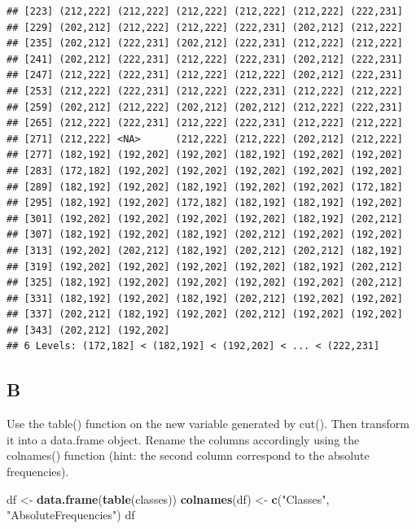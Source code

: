 \documentclass[
]{article}
\newenvironment{Shaded}{\begin{snugshade}}{\end{snugshade}}
\newcommand{\FunctionTok}[1]{\textcolor[rgb]{0.13,0.29,0.53}{\textbf{#1}}}
\newcommand{\NormalTok}[1]{#1}
\newcommand{\OtherTok}[1]{\textcolor[rgb]{0.56,0.35,0.01}{#1}}
\newcommand{\StringTok}[1]{\textcolor[rgb]{0.31,0.60,0.02}{#1}}
\begin{document}
\begin{verbatim}
## [223] (212,222] (212,222] (212,222] (212,222] (212,222] (222,231]
## [229] (202,212] (212,222] (212,222] (222,231] (202,212] (212,222]
## [235] (202,212] (222,231] (202,212] (222,231] (212,222] (212,222]
## [241] (202,212] (222,231] (212,222] (222,231] (202,212] (222,231]
## [247] (212,222] (222,231] (212,222] (212,222] (202,212] (222,231]
## [253] (212,222] (222,231] (212,222] (222,231] (212,222] (212,222]
## [259] (202,212] (212,222] (202,212] (202,212] (212,222] (222,231]
## [265] (212,222] (222,231] (212,222] (222,231] (212,222] (212,222]
## [271] (212,222] <NA>      (212,222] (212,222] (202,212] (212,222]
## [277] (182,192] (192,202] (192,202] (182,192] (192,202] (192,202]
## [283] (172,182] (192,202] (192,202] (192,202] (192,202] (192,202]
## [289] (182,192] (192,202] (182,192] (192,202] (192,202] (172,182]
## [295] (182,192] (192,202] (172,182] (182,192] (182,192] (192,202]
## [301] (192,202] (192,202] (192,202] (192,202] (182,192] (202,212]
## [307] (182,192] (192,202] (182,192] (202,212] (192,202] (192,202]
## [313] (192,202] (202,212] (182,192] (202,212] (202,212] (182,192]
## [319] (192,202] (192,202] (192,202] (192,202] (182,192] (202,212]
## [325] (182,192] (192,202] (192,202] (192,202] (192,202] (202,212]
## [331] (182,192] (192,202] (182,192] (202,212] (192,202] (192,202]
## [337] (202,212] (182,192] (192,202] (202,212] (192,202] (192,202]
## [343] (202,212] (192,202]
## 6 Levels: (172,182] < (182,192] < (192,202] < ... < (222,231]
\end{verbatim}

\hypertarget{b-1}{%
\subsection{B}\label{b-1}}

Use the table() function on the new variable generated by cut(). Then
transform it into a data.frame object. Rename the columns accordingly
using the colnames() function (hint: the second column correspond to the
absolute frequencies).

\begin{Shaded}
\begin{Highlighting}[]
\NormalTok{df }\OtherTok{\textless{}{-}} \FunctionTok{data.frame}\NormalTok{(}\FunctionTok{table}\NormalTok{(classes))}
\FunctionTok{colnames}\NormalTok{(df) }\OtherTok{\textless{}{-}} \FunctionTok{c}\NormalTok{(}\StringTok{"Classes"}\NormalTok{, }\StringTok{"AbsoluteFrequencies"}\NormalTok{)}
\NormalTok{df}
\end{Highlighting}
\end{Shaded}
\end{document}
